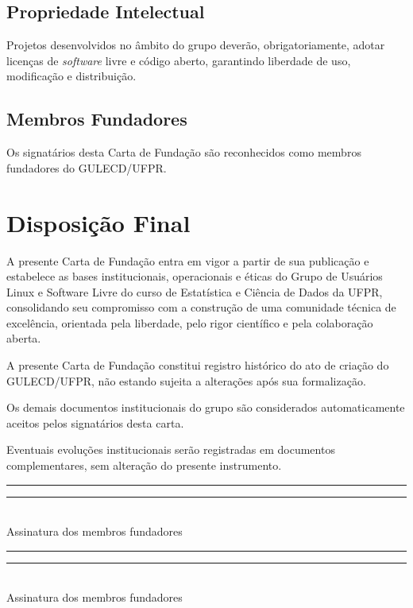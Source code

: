 \documentclass[
  12pt,          %
  a4paper,       %
  oneside,       %
  brazil         %
]{article}
\begin{document}
\subsection{Propriedade Intelectual}

Projetos desenvolvidos no âmbito do grupo deverão, obrigatoriamente, adotar licenças de \textit{software} livre e código aberto, 
garantindo liberdade de uso, modificação e distribuição.

\subsection{Membros Fundadores}

Os signatários desta Carta de Fundação são reconhecidos como membros fundadores do GULECD/UFPR.

\section{Disposição Final}

A presente Carta de Fundação entra em vigor a partir de sua publicação e estabelece as bases institucionais, 
operacionais e éticas do Grupo de Usuários Linux e Software Livre do curso de Estatística e Ciência de Dados da UFPR, consolidando seu compromisso 
com a construção de uma comunidade técnica de excelência, orientada pela liberdade, pelo rigor científico e pela colaboração aberta.

A presente Carta de Fundação constitui registro histórico do ato de criação do GULECD/UFPR, não estando sujeita a alterações após sua formalização.

Os demais documentos institucionais do grupo são considerados automaticamente aceitos pelos signatários desta carta.

Eventuais evoluções institucionais serão registradas em documentos complementares, sem alteração do presente instrumento.

\vspace{2cm}
\begin{center}
\rule{0.45\textwidth}{0.4pt}\hfill\rule{0.45\textwidth}{0.4pt}\\[0.3em]
\small\color{gulecdGray}
Assinatura dos membros fundadores
\end{center}

\newpage
\vspace{2cm}
\begin{center}
\rule{0.45\textwidth}{0.4pt}\hfill\rule{0.45\textwidth}{0.4pt}\\[0.3em]
\small\color{gulecdGray}
Assinatura dos membros fundadores
\end{center}
\end{document}
